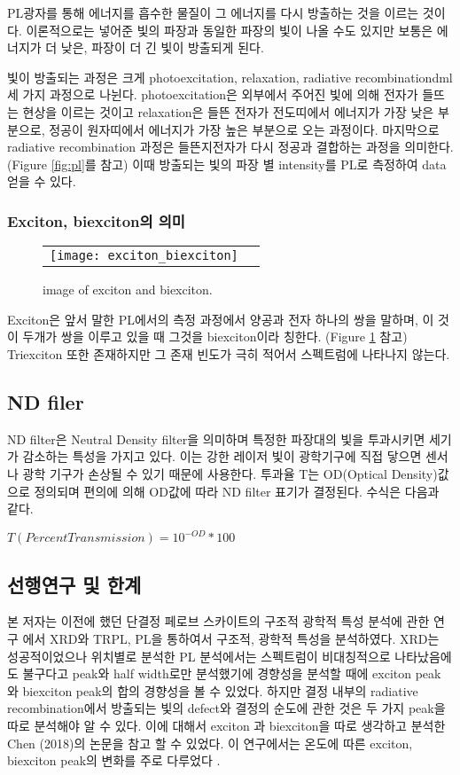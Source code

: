 PL\은 광자를 통해 에너지를 흡수한 물질이 그 에너지를 다시 방출하는 것을 이르는 것이다. 이론적으로는 넣어준 빛의 파장과 동일한 파장의 빛이 나올 수도 있지만 보통은 에너지가 더 낮은, 파장이 더 긴 빛이 방출되게 된다. 

빛이 방출되는 과정은 크게 photoexcitation, relaxation, radiative recombinationdml 세 가지 과정으로 나뉜다. photoexcitation은 외부에서 주어진 빛에 의해 전자가 들뜨는 현상을 이르는 것이고 relaxation은 들뜬 전자가 전도띠에서 에너지가 가장 낮은 부분으로, 정공이 원자띠에서 에너지가 가장 높은 부분으로 오는 과정이다. 마지막으로 radiative recombination 과정은 들뜬지전자가 다시 정공과 결합하는 과정을 의미한다. (Figure \ref{fig:pl}를 참고) 이때 방출되는 빛의 파장 별 intensity를 PL로 측정하여 data\를 얻을 수 있다.

\subsubsection{Exciton, biexciton의 의미}
\begin{figure}[H]
	\begin{center}
		\begin{tabular}{cc}
			\texttt{[image: exciton\_biexciton]}
		\end{tabular}
	\end{center}
	\caption{image of exciton and biexciton.}
	\label{fig:ex}  
\end{figure}
Exciton은 앞서 말한 PL에서의 측정 과정에서 양공과 전자 하나의 쌍을 말하며, 이 것이 두개가 쌍을 이루고 있을 때 그것을 biexciton이라 칭한다. (Figure \ref{fig:ex} 참고) Triexciton 또한 존재하지만 그 존재 빈도가 극히 적어서 스펙트럼에 나타나지 않는다. 

\subsection{ND filer}
ND filter은 Neutral Density filter을 의미하며 특정한 파장대의 빛을 투과시키면 세기가 감소하는 특성을 가지고 있다. 이는 강한 레이저 빛이 광학기구에 직접 닿으면 센서나 광학 기구가 손상될 수 있기 때문에 사용한다. 투과율 T는 OD(Optical Density)값으로 정의되며
편의에 의해 OD값에 따라 ND filter 표기가 결정된다. 수식은 다음과 같다.

$T(Percent Transmission) = 10^{-OD}*100$

\subsection{선행연구 및 한계}
본 저자는 이전에 했던 단결정 페로브 스카이트의 구조적 광학적 특성 분석에 관한 연구 에서 XRD와 TRPL, PL을 통하여서 구조적, 광학적 특성을 분석하였다. XRD는 성공적이었으나 위치별로 분석한 PL 분석에서는 스펙트럼이 비대칭적으로 나타났음에도 불구다고 peak와 half width로만 분석했기에 경향성을 분석할 때에 exciton peak 와 biexciton peak의 합의 경향성을 볼 수 있었다. 하지만 결정 내부의 radiative recombination에서 방출되는 빛의 defect와 결정의 순도에 관한 것은 두 가지 peak을 따로 분석해야 알 수 있다. 이에 대해서 exciton 과 biexciton을 따로 생각하고 분석한 Chen (2018)의 논문을 참고 할 수 있었다. 이 연구에서는 온도에 따른 exciton, biexciton peak의 변화를 주로 다루었다 \cite{chen2018room}. 

